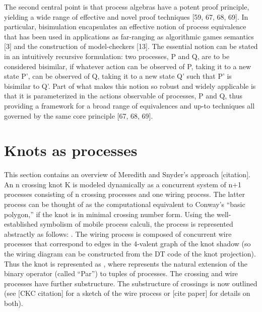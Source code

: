 \documentclass[12pt]{amsart}
\begin{document}
The second central point is that process algebras have a potent proof principle, yielding a wide range of effective and novel proof techniques [59, 67, 68, 69]. In particular, bisimulation encapsulates an effective notion of process equivalence that has been used in applications as far-ranging as algorithmic games semantics [3] and the construction of model-checkers [13]. The essential notion can be stated in an intuitively recursive formulation: two processes, P and Q, are to be considered bisimilar, if whatever action can be observed of P, taking it to a new state P’, can be observed of Q, taking it to a new state Q’ such that P’ is bisimilar to Q’. Part of what makes this notion so robust and widely applicable is that it is parameterized in the actions observable of processes, P and Q, thus providing a framework for a broad range of equivalences and up-to techniques all governed by the same core principle [67, 68, 69].
    
\section{Knots as processes}\label{sec:knots_as_processes} %

This section contains an overview of Meredith and Snyder’s approach [citation]. An n crossing knot K is modeled dynamically as a concurrent system of n+1 processes consisting of n crossing processes and one wiring process. The latter process can be thought of as the computational equivalent to Conway’s “basic polygon,” if the knot is in minimal crossing number form. Using the well-established symbolism of mobile process calculi, the process is represented abstractly as follows:  . The wiring process is composed of   concurrent wire processes that correspond to edges in the 4-valent graph of the knot shadow (so the wiring diagram can be constructed from the DT code of the knot projection). Thus the knot is represented as  , where   represents the natural extension of the binary operator  (called “Par”) to tuples of processes. The crossing and wire processes have further substructure. The substructure of crossings is now outlined (see [CKC citation] for a sketch of the wire process or [cite paper] for details on both).
\end{document}
